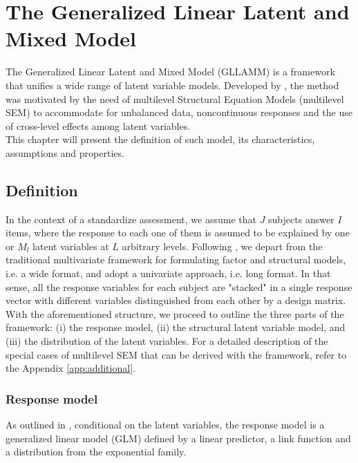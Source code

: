 \chapter{The Generalized Linear Latent and Mixed Model} \label{chap:framework}

The Generalized Linear Latent and Mixed Model (GLLAMM) is a framework that unifies a wide range of latent variable models. Developed by \citet{Rabe_et_al_2004a, Rabe_et_al_2004b, Skrondal_et_al_2004}, the method was motivated by the need of multilevel Structural Equation Models (multilevel SEM) to accommodate for unbalanced data, noncontinuous responses and the use of cross-level effects among latent variables. \\

This chapter will present the definition of such model, its characteristics, assumptions and properties.


\section{Definition}

In the context of a standardize assessment, we assume that $J$ subjects answer $I$ items, where the response to each one of them is assumed to be explained by one or $M_{l}$ latent variables at $L$ arbitrary levels. Following \citet{Rabe_et_al_2004a}, we depart from the traditional multivariate framework for formulating factor and structural models, i.e. a wide format, and adopt a univariate approach, i.e. long format. In that sense, all the response variables for each subject are "stacked" in a single response vector with different variables distinguished from each other by a design matrix. \\

With the aforementioned structure, we proceed to outline the three parts of the framework: (i) the response model, (ii) the structural latent variable model, and (iii) the distribution of the latent variables. For a detailed description of the special cases of multilevel SEM that can be derived with the framework, refer to the Appendix \ref{app:additional}.


\subsection{Response model}

As outlined in \citet{Rabe_et_al_2004a, Rabe_et_al_2012}, conditional on the latent variables, the response model is a generalized linear model (GLM) defined by a linear predictor, a link function and a distribution from the exponential family.

